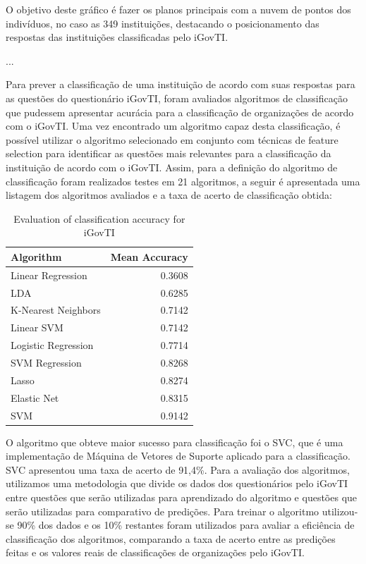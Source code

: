 O objetivo deste gráfico é fazer os planos principais com a nuvem de pontos dos indivíduos, no caso as 349 instituições, destacando o posicionamento das respostas das instituições classificadas pelo iGovTI. 

...

Para prever a classificação de uma instituição de acordo com suas respostas para as questões do questionário iGovTI, foram avaliados algoritmos de classificação que pudessem apresentar acurácia para a classificação de organizações de acordo com o iGovTI. Uma vez encontrado um algoritmo capaz desta classificação, é possível utilizar o algoritmo selecionado em conjunto com técnicas de feature selection para identificar as questões mais relevantes para a classificação da instituição de acordo com o iGovTI.
Assim, para a definição do algoritmo de classificação foram realizados testes em 21 algoritmos, a seguir é apresentada uma listagem dos algoritmos avaliados e a taxa de acerto de classificação obtida: 

\begin{table}[!t]
	\caption{Evaluation of classification accuracy for iGovTI}
  	\label{tab:ch2_tab3}
	\centering
	\begin{tabular}{|l|r|}
		\hline \rowcolor{Gray} Algorithm	& Mean Accuracy\\\hline
		Linear Regression \cite{draper2014applied}	&0.3608\\ \hline
		LDA \cite{martinez2001pca}	&0.6285\\ \hline
		K-Nearest Neighbors \cite{fukunaga1975branch}	&0.7142\\ \hline
		Linear SVM \cite{fan2008liblinear}	&0.7142\\ \hline
		Logistic Regression \cite{hosmer2013applied}	&0.7714\\ \hline
		SVM Regression \cite{smola2004tutorial}	&0.8268\\ \hline
		Lasso \cite{tibshirani1996regression}	&0.8274\\ \hline
		Elastic Net \cite{zou2005regularization}	&0.8315\\ \hline
		SVM \cite{hearst1998support}	&0.9142\\ \hline
	\end{tabular}
\end{table}

O algoritmo que obteve maior sucesso para classificação foi o SVC, que é uma implementação de Máquina de Vetores de Suporte aplicado para a classificação. SVC apresentou uma taxa de acerto de 91,4\%. Para a avaliação dos algoritmos, utilizamos uma metodologia que divide os dados dos questionários pelo iGovTI entre questões que serão utilizadas para aprendizado do algoritmo e questões que serão utilizadas para comparativo de predições. Para treinar o algoritmo utilizou-se 90\% dos dados e os 10\% restantes foram utilizados para avaliar a eficiência de classificação dos algoritmos, comparando a taxa de acerto entre as predições feitas e os valores reais de classificações de organizações pelo iGovTI. 

